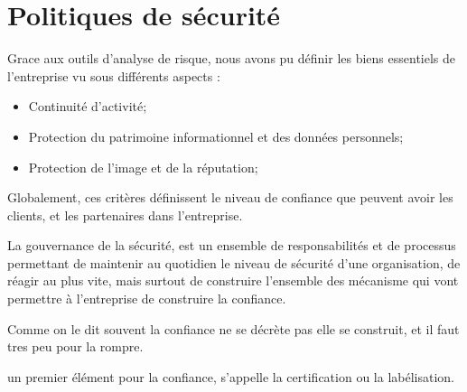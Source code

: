 \section{Politiques de sécurité}

Grace aux outils d’analyse de risque, nous avons pu définir les biens essentiels de l’entreprise vu sous différents aspects :
\begin{itemize}
\item Continuité d’activité;
\item Protection du patrimoine informationnel et des données personnels;
\item Protection de l’image et de la réputation;
\end{itemize}

Globalement, ces critères définissent le niveau de confiance que peuvent avoir les clients, et les partenaires dans l’entreprise.

La gouvernance de la sécurité, est un ensemble de responsabilités et de processus permettant de maintenir au quotidien le niveau de sécurité d’une organisation, de réagir au plus vite, mais surtout de construire l’ensemble des mécanisme qui vont permettre à l’entreprise de construire la confiance.

Comme on le dit souvent la confiance ne se décrète pas elle se construit, et il faut tres peu pour la rompre.

un premier élément pour la confiance, s’appelle la certification ou la labélisation. 



